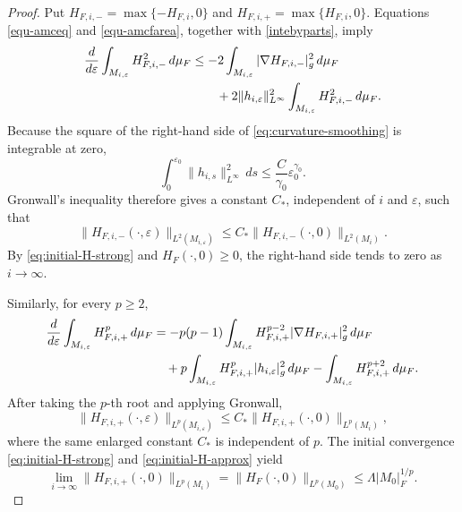 \documentclass[10pt,a4paper]{amsart}
\numberwithin{equation}{section}
\begin{document}
\begin{proof}
Put $ H_{F,i,-}=\max\{-H_{F,i},0\}$ and $ H_{F,i,+}=\max\{H_{F,i},0\}$. 
Equations \eqref{equ-amceq} and \eqref{equ-amcfarea}, together with \eqref{intebyparts}, imply
\begin{align*}
 \frac{d}{d\varepsilon}\int_{M_{i,\varepsilon}}H_{F,i,-}^2\,d\mu_F
 &\leq-2\int_{M_{i,\varepsilon}}
 |\nabla H_{F,i,-}|_{g}^2\,d\mu_F \notag\\
 &\qquad+2\|h_{i,\varepsilon}\|_{L^\infty}^2
 \int_{M_{i,\varepsilon}}H_{F,i,-}^2\,d\mu_F.
\end{align*}
Because the square of the right-hand side of \eqref{eq:curvature-smoothing} is integrable at zero,
\begin{equation*}
 \int_0^{\varepsilon_0}\|h_{i,s}\|_{L^\infty}^2\,ds
 \leq \frac{C}{\gamma_0}\varepsilon_0^{\gamma_0}.
\end{equation*}
Gronwall's inequality therefore gives a constant $C_*$, independent of $i$ and $\varepsilon$, such that
\begin{equation}
\label{eq:negative-part-approximants-bound}
 \|H_{F,i,-}(\cdot,\varepsilon)\|_{L^2(M_{i,\varepsilon})}
 \leq C_*\|H_{F,i,-}(\cdot,0)\|_{L^2(M_i)}.
\end{equation}
By \eqref{eq:initial-H-strong} and $H_F(\cdot,0)\geq0$, the right-hand side tends to zero as $i\to\infty$.

Similarly, for every $p\geq2$,
\begin{align*}
 \frac{d}{d\varepsilon}\int_{M_{i,\varepsilon}}H_{F,i,+}^p\,d\mu_F
 &=-p(p-1)\int_{M_{i,\varepsilon}}H_{F,i,+}^{p-2}
 |\nabla H_{F,i,+}|_{g}^2\,d\mu_F \notag\\
 &\quad+p\int_{M_{i,\varepsilon}}H_{F,i,+}^p
 |h_{i,\varepsilon}|_{g}^2\,d\mu_F
 -\int_{M_{i,\varepsilon}}H_{F,i,+}^{p+2}\,d\mu_F.
\end{align*}
After taking the $p$-th root and applying Gronwall,
\begin{equation}
\label{eq:positive-part-approximants-bound}
 \|H_{F,i,+}(\cdot,\varepsilon)\|_{L^p(M_{i,\varepsilon})}
 \leq C_*\|H_{F,i,+}(\cdot,0)\|_{L^p(M_i)},
\end{equation}
where the same enlarged constant $C_*$ is independent of $p$. The initial convergence \eqref{eq:initial-H-strong} and \eqref{eq:initial-H-approx} yield
\begin{equation}
\label{eq:initial-positive-Lp}
 \lim_{i\to\infty}\|H_{F,i,+}(\cdot,0)\|_{L^p(M_i)}
 =\|H_F(\cdot,0)\|_{L^p(M_0)}
 \leq\Lambda |M_0|_F^{1/p}.
\end{equation}



\end{proof}
\end{document}
